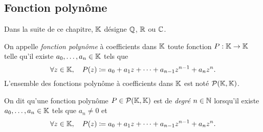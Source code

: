 \documentclass{magnolia}
\begin{document}
\subsection{Fonction polynôme}

Dans la suite de ce chapitre, $\mathbb{K}$ désigne $\mathbb{Q}$, $\mathbb{R}$ ou $\mathbb{C}$.

\begin{definition}
On appelle \emph{fonction polynôme} à coefficients dans $\mathbb{K}$ toute fonction
$P:\mathbb{K}\to\mathbb{K}$ telle qu'il existe $a_0,\ldots,a_n\in\mathbb{K}$ tels que
\[\forall z\in\mathbb{K},\quad P(z)\coloneqq a_0 + a_1 z + \cdots +  a_{n-1} z^{n-1} + a_n z^n.\]
L'ensemble des fonctions polynôme à coefficients dans $\mathbb{K}$ est noté $\mathcal{P}(\mathbb{K},\mathbb{K})$.
\end{definition}

\begin{remarqueUnique}
\remarque On dit qu'une fonction polynôme $P\in\mathcal{P}(\mathbb{K},\mathbb{K})$ est de \emph{degré}
  $n\in\mathbb{N}$ lorsqu'il existe $a_0,\ldots,a_n\in\mathbb{K}$ tels que $a_n\neq 0$ et
  \[\forall z\in\mathbb{K},\quad P(z)\coloneqq a_0 + a_1 z + \cdots +  a_{n-1} z^{n-1} + a_n z^n.\]
\end{remarqueUnique}
\end{document}
